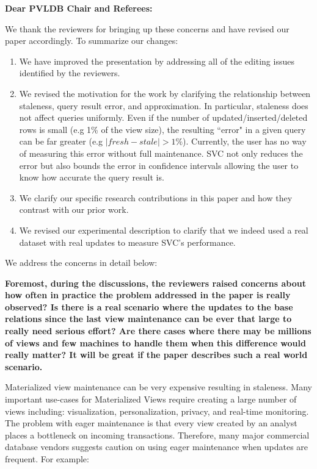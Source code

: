 {\noindent \normalsize \bf Dear PVLDB Chair and Referees: }

We thank the reviewers for bringing up these concerns and have revised our paper accordingly. To summarize our changes:
\begin{enumerate}[noitemsep]
\item We have improved the presentation by addressing all of the editing issues identified by the reviewers.
\item We revised the motivation for the work by clarifying the relationship between staleness, query result error, and approximation. In particular, staleness does not affect queries uniformly. Even if the number of updated/inserted/deleted rows is small (e.g 1\% of the view size), the resulting ``error" in a given query can be far greater (e.g $\mid fresh - stale\mid > 1\%$). Currently, the user has no way of measuring this error without full maintenance. SVC not only reduces the error but also bounds the error in confidence intervals allowing the user to know how accurate the query result is.
\item We clarify our specific research contributions in this paper and how they contrast with our prior work.
\item We revised our experimental description to clarify that we indeed used a real dataset with real updates to measure SVC’s performance. 
\end{enumerate}

We address the concerns in detail below: 

\vspace{1.5em}

\textbf{Foremost, during the discussions, the reviewers raised concerns about how often in practice the problem addressed in the paper is really observed? Is there is a real scenario where the updates to the base relations since the last view maintenance can be ever that large to really need serious effort? Are there cases where there may be millions of views and few machines to handle them when this difference would really matter? It will be great if the paper describes such a real world scenario.}

Materialized view maintenance can be very expensive resulting in staleness. Many important use-cases for Materialized Views require creating a large number of views including: visualization, personalization, privacy, and real-time monitoring. The problem with eager maintenance is that every view created by an analyst places a bottleneck on incoming transactions.  Therefore, many major commercial database vendors suggests caution on using eager maintenance when updates are frequent. For example:

